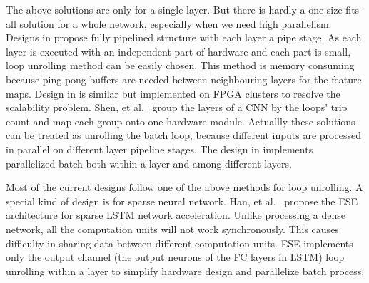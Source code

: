 The above solutions are only for a single layer. But there is hardly a one-size-fits-all solution for a whole network, especially when we need high parallelism. Designs in \cite{li2016high, liu2016automatic} propose fully pipelined structure with each layer a pipe stage. As each layer is executed with an independent part of hardware and each part is small, loop unrolling method can be easily chosen. This method is memory consuming because ping-pong buffers are needed between neighbouring layers for the feature maps. Design in \cite{zhang2016energy} is similar but implemented on FPGA clusters to resolve the scalability problem. Shen, et al.~\cite{shen2016overcoming} group the layers of a CNN by the loops' trip count and map each group onto one hardware module. Actuallly these solutions can be treated as unrolling the batch loop, because different inputs are processed in parallel on different layer pipeline stages. The design in \cite{lu2017evaluating} implements parallelized batch both within a layer and among different layers. 

Most of the current designs follow one of the above methods for loop unrolling. A special kind of design is for sparse neural network. Han, et al.~\cite{han2017ese} propose the ESE architecture for sparse LSTM network acceleration. Unlike processing a dense network, all the computation units will not work synchronously. This causes difficulty in sharing data between different computation units. ESE implements only the output channel (the output neurons of the FC layers in LSTM) loop unrolling within a layer to simplify hardware design and parallelize batch process.



